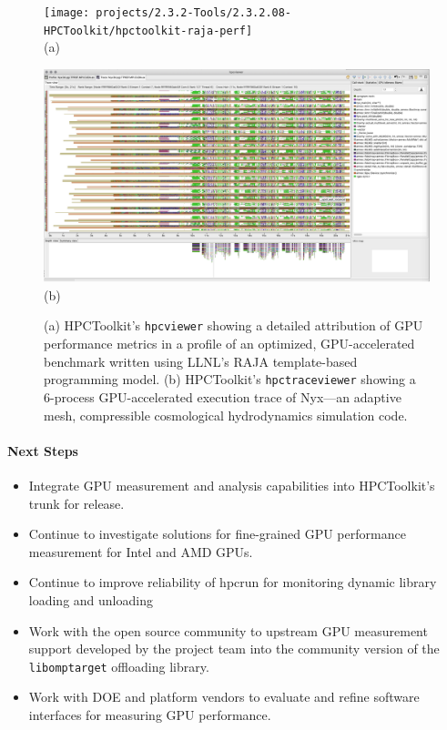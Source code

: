 \begin{figure}[t]
\captionsetup{width=.96\textwidth}
\begin{minipage}[t]{.48\textwidth}
\centering
\texttt{[image: projects/2.3.2-Tools/2.3.2.08-HPCToolkit/hpctoolkit-raja-perf]}
\\(a)
\end{minipage}
\hfill
\begin{minipage}[t]{.48\textwidth}
\centering
\includegraphics[width=\textwidth]{projects/2.3.2-Tools/2.3.2.08-HPCToolkit/hpctoolkit-nyx-trace}
\\(b)
\end{minipage}
\caption{(a) 
HPCToolkit's {\tt hpcviewer} showing a detailed attribution of GPU performance metrics in a 
profile of an optimized, GPU-accelerated benchmark written using LLNL's RAJA template-based programming model.
(b) HPCToolkit's {\tt hpctraceviewer} showing a 6-process GPU-accelerated execution trace of Nyx---an adaptive mesh, compressible cosmological hydrodynamics simulation code.}
\label{fig:hpctoolkit}
\end{figure}

\paragraph{Next Steps}
\begin{itemize}

\item 
Integrate GPU measurement and analysis capabilities into HPCToolkit's trunk for
release.

\item 
Continue to investigate solutions for fine-grained GPU performance measurement for Intel and AMD GPUs.

\item 
Continue to improve reliability of hpcrun for monitoring dynamic library loading and unloading

\item 
Work with the open source community to upstream GPU measurement support
developed by the project team into the community version of the {\tt
libomptarget} offloading library.

\item 
Work with DOE and platform vendors to evaluate and refine software interfaces for measuring GPU performance.

\end{itemize}
